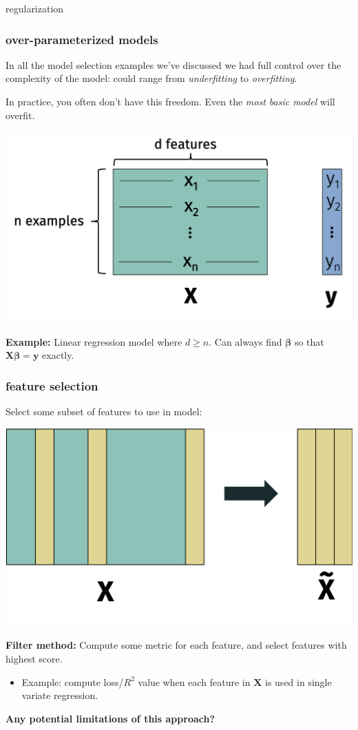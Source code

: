 \documentclass[handout,compress]{beamer}
\newcommand{\bs}[1]{\boldsymbol{#1}}
\newcommand{\bv}[1]{\mathbf{#1}}
\begin{document}
\begin{frame}[standout]
	\begin{center}
		\large regularization
	\end{center}
\end{frame}

\begin{frame}
	\frametitle{over-parameterized models}
	In all the model selection examples we've discussed we had full control over the complexity of the model: could range from \emph{underfitting} to \emph{overfitting}. 
		
	\begin{center}
		In practice, you often don't have this freedom. Even the \emph{most basic model} will overfit. 
		
		\includegraphics[width=.5\textwidth]{overparameterized.png}
		
		\textbf{Example:} Linear regression model where $d \geq n$. Can always find $\bs{\beta}$ so that $\bv{X}\bs{\beta} = \bv{y}$ exactly. 
	\end{center}
\end{frame}

\begin{frame}
	\frametitle{feature selection}
	Select some subset of features to use in model:
	\begin{center}
			\includegraphics[width=.5\textwidth]{feature_selection.png}
	\end{center}
	\textbf{Filter method:} Compute some metric for each feature, and select features with highest score. 
	\begin{itemize}
		\item Example: compute loss/$R^2$ value when each feature in $\bv{X}$ is used in single variate regression. 
	\end{itemize} 
\begin{center}
	\alert{\textbf{Any potential limitations of this approach?}}
\end{center}
\end{frame}
\end{document}
